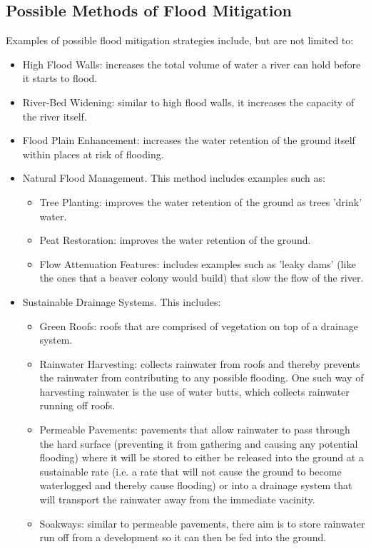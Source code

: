 \documentclass[11 pt, a4paper]{article}
\begin{document}
\subsection{Possible Methods of Flood Mitigation}
Examples of possible flood mitigation strategies include, but are not limited to:\\
\begin{itemize}
\item High Flood Walls: increases the total volume of water a river can hold before it starts to flood.
\item River-Bed Widening: similar to high flood walls, it increases the capacity of the river itself.
\item Flood Plain Enhancement: increases the water retention of the ground itself within places at risk of flooding.
\item Natural Flood Management. This method includes examples such as:
\begin{itemize}
\item Tree Planting:  improves the water retention of the ground as trees 'drink' water.
\item Peat Restoration: improves the water retention of the ground.
\item Flow Attenuation Features: includes examples such as 'leaky dams' (like the ones that a beaver colony would build) that slow the flow of the river.
\end{itemize}
\item Sustainable Drainage Systems. This includes: \cite{4}
\begin{itemize}
\item Green Roofs: roofs that are comprised of vegetation on top of a drainage system.
\item Rainwater Harvesting: collects rainwater from roofs and thereby prevents the rainwater from contributing to any possible flooding. One such way of harvesting rainwater is the use of water butts, which collects rainwater running off roofs.
\item Permeable Pavements: pavements that allow rainwater to pass through the hard surface (preventing it from gathering and causing any potential flooding) where it will be stored to either be released into the ground at a sustainable rate (i.e. a rate that will not cause the ground to become waterlogged and thereby cause flooding) or into a drainage system that will transport the rainwater away from the immediate vacinity.
\item Soakways: similar to permeable pavements, there aim is to store rainwater run off from a development so it can then be fed into the ground.

\end{itemize}
\end{itemize}
\end{document}

